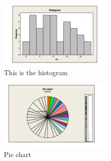 \documentclass{article}
\begin{document}
\begin{center}
    \begin{figure}[H]
        \centering
        \includegraphics[width=0.5\textwidth]{histogram.png} %
        \caption{This is the histogram}
        \label{fig:image_label}
    \end{figure}
    \begin{figure}[H]
        \centering
        \includegraphics[width=0.5\textwidth]{pie.png} %
        \caption{Pie chart}
        \label{fig:image_label}
    \end{figure}
\end{center}
\end{document}
